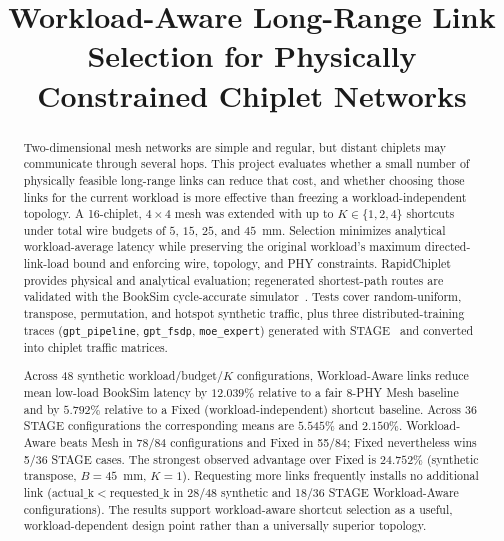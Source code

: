 \documentclass[conference]{IEEEtran}
\begin{document}
\title{Workload-Aware Long-Range Link Selection for Physically Constrained Chiplet Networks}

\author{
}

\maketitle

\begin{abstract}
Two-dimensional mesh networks are simple and regular, but distant chiplets may communicate through several hops. This project evaluates whether a small number of physically feasible long-range links can reduce that cost, and whether choosing those links for the current workload is more effective than freezing a workload-independent topology. A 16-chiplet, $4\times4$ mesh was extended with up to $K \in \{1,2,4\}$ shortcuts under total wire budgets of $5$, $15$, $25$, and $45$~mm. Selection minimizes analytical workload-average latency while preserving the original workload's maximum directed-link-load bound and enforcing wire, topology, and PHY constraints. RapidChiplet~\cite{rapidchiplet} provides physical and analytical evaluation; regenerated shortest-path routes are validated with the BookSim cycle-accurate simulator~\cite{booksim}. Tests cover random-uniform, transpose, permutation, and hotspot synthetic traffic, plus three distributed-training traces (\texttt{gpt\_pipeline}, \texttt{gpt\_fsdp}, \texttt{moe\_expert}) generated with STAGE~\cite{stage} and converted into chiplet traffic matrices.

Across 48 synthetic workload/budget/$K$ configurations, Workload-Aware links reduce mean low-load BookSim latency by $12.039\%$ relative to a fair 8-PHY Mesh baseline and by $5.792\%$ relative to a Fixed (workload-independent) shortcut baseline. Across 36 STAGE configurations the corresponding means are $5.545\%$ and $2.150\%$. Workload-Aware beats Mesh in 78/84 configurations and Fixed in 55/84; Fixed nevertheless wins 5/36 STAGE cases. The strongest observed advantage over Fixed is $24.752\%$ (synthetic transpose, $B{=}45$~mm, $K{=}1$). Requesting more links frequently installs no additional link ($\mathrm{actual\_k} < \mathrm{requested\_k}$ in 28/48 synthetic and 18/36 STAGE Workload-Aware configurations). The results support workload-aware shortcut selection as a useful, workload-dependent design point rather than a universally superior topology.
\end{abstract}
\end{document}
